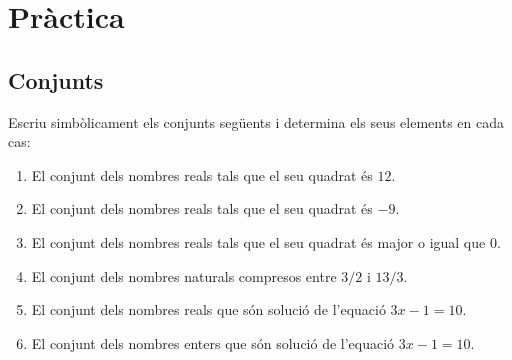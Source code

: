 \chapter{Pràctica}
\label{cap:practica}

\section{Conjunts}

\begin{exercici}
Escriu simbòlicament els conjunts següents i determina els seus
elements en cada cas:

\begin{enumerate}
\item El conjunt dels nombres reals tals que el seu quadrat és $12$.

\item El conjunt dels nombres reals tals que el seu quadrat és $-9$.

\item El conjunt dels nombres reals tals que el seu quadrat és major o
igual que $0$.

\item El conjunt dels nombres naturals compresos entre $3/2$ i $13/3$.

\item El conjunt dels nombres reals que són solució de l'equació
$3x-1=10$.

\item El conjunt dels nombres enters que són solució de l'equació
$3x-1=10$.
\end{enumerate}
\end{exercici}

